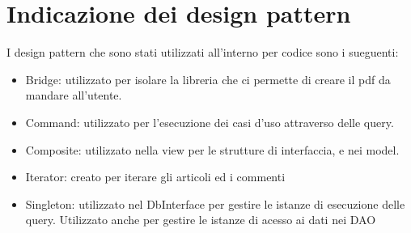 \chapter{Indicazione dei design pattern}

I design pattern che sono stati utilizzati all'interno per codice sono i sueguenti:

\begin{itemize}
    \item Bridge: utilizzato per isolare la libreria che ci permette di creare il pdf da mandare all'utente.
    \item Command: utilizzato per l'esecuzione dei casi d'uso attraverso delle query.
    \item Composite: utilizzato nella view per le strutture di interfaccia, e nei model.
    \item Iterator: creato per iterare gli articoli ed i commenti
    \item Singleton: utilizzato nel DbInterface per gestire le istanze di esecuzione delle query. Utilizzato anche per gestire le istanze di acesso ai dati nei DAO
\end{itemize}